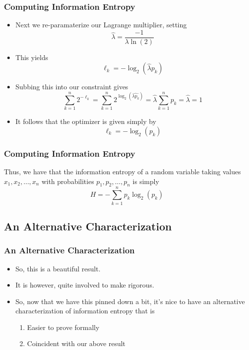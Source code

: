 \documentclass[xcolor=dvipsnames]{beamer}
\begin{document}
	\begin{frame}
	\frametitle{Computing Information Entropy}
    	\begin{itemize}
    	    \item Next we re-paramaterize our Lagrange multiplier, setting $$\hat{\lambda} = \frac{-1}{\lambda \ln(2)} $$
    	    \pause
    	    \item This yields $$ \ell_k = - \log_2\left( \hat{\lambda}p_k\right)$$
    	    \pause 
    	    \item Subbing this into our constraint gives $$ \sum_{k=1}^n 2^{-\ell_k} = \sum_{k=1}^n 2^{\log_2\left(\hat{\lambda p_k} \right)} = \hat{\lambda} \sum_{k=1}^n p_k = \hat{\lambda} = 1 $$
    	    \pause
    	    \item It follows that the optimizer is given simply by $$ \ell_k = -\log_2(p_k) $$
    	\end{itemize}
	\end{frame}
	
	\begin{frame}
	\frametitle{Computing Information Entropy}
	Thus, we have that the information entropy of a random variable taking values $x_1, x_2, \dots, x_n$ with probabilities $p_1, p_2, \dots, p_n$ is simply $$ \boxed{H = -\sum_{k=1}^n p_k \log_2(p_k)} $$
	\end{frame}
	
	
	\subsection{An Alternative Characterization}
	\begin{frame}
	\frametitle{An Alternative Characterization}
	    \begin{itemize}
	        \item So, this is a beautiful result. 
	        \pause
	        \item It is however, quite involved to make rigorous.
	        \pause
	        \item So, now that we have this pinned down a bit, it's nice to have an alternative characterization of information entropy that is 
	            \begin{enumerate}
	                \item Easier to prove formally
	                \item Coincident with our above result
	            \end{enumerate}
	    \end{itemize}
	\end{frame}
	
\end{document}
